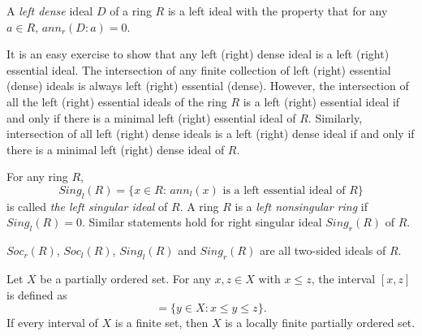 \documentclass[12pt]{article}
\newtheorem{proposition}[theorem]{Proposition}
\begin{document}
A \textit{left dense} ideal $D$ of a ring $R$ is a left ideal with the
property that for any $a\in R$, $ann_r(D:a)=0.$

It is an easy exercise to show that any left (right) dense ideal is a left
(right) essential ideal. The intersection of any finite collection of left
(right) essential (dense) ideals is always left (right) essential (dense).
However, the intersection of all the left (right) essential ideals of the
ring $R$ is a left (right) essential ideal if and only if there is a minimal
left (right) essential ideal of $R$. Similarly, intersection of all left
(right) dense ideals is a left (right) dense ideal if and only if there is a
minimal left (right) dense ideal of $R$.

For any ring $R$, 
\begin{equation*}
Sing_l(R)=\{x\in R: \, ann_l(x) \text{ is a left essential ideal of } R\}
\end{equation*}
is called \textit{the left singular ideal} of $R$. A ring $R$ is a \textit{%
left nonsingular ring} if $Sing_l(R)=0.$ Similar statements hold for right
singular ideal $Sing_r(R)$ of $R$.

$Soc_r(R)$, $Soc_l(R)$, $Sing_l(R)$ and $Sing_r(R)$ are all two-sided ideals
of $R$.



Let $X$ be a partially ordered set. For any $x,z\in X$ with $x \leq z$, the
interval $[x,z]$ is defined as \newline
\begin{equation*}
[x,z]=\{ y\in X: x \leq y\leq z\}.
\end{equation*}
If every interval of $X$ is a finite set, then $X$ is a locally finite
partially ordered set.
\end{document}
